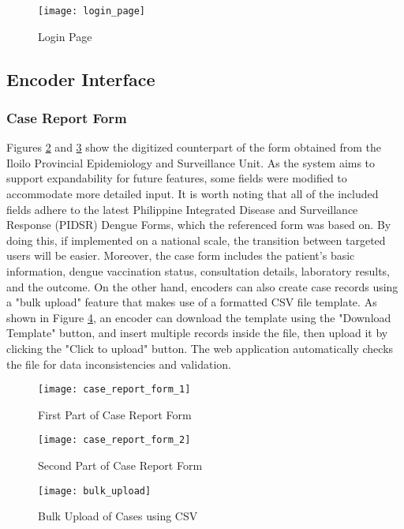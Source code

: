 \begin{figure}[H]
	\centering
	\texttt{[image: login\_page]}
	\caption{Login Page}
	\label{fig:login_page}
\end{figure}

\subsection{Encoder Interface}
\subsubsection{Case Report Form}
Figures \ref{fig:case_report_form_1} and \ref{fig:case_report_form_2} show the digitized counterpart of the form obtained from the Iloilo Provincial Epidemiology and Surveillance Unit. As the system aims to support expandability for future features, some fields were modified to accommodate more detailed input. It is worth noting that all of the included fields adhere to the latest Philippine Integrated Disease and Surveillance Response (PIDSR) Dengue Forms, which the referenced form was based on. By doing this, if implemented on a national scale, the transition between targeted users will be easier. Moreover, the case form includes the patient's basic information, dengue vaccination status, consultation details, laboratory results, and the outcome. On the other hand, encoders can also create case records using a "bulk upload" feature that makes use of a formatted CSV file template. As shown in Figure \ref{fig:bulk_upload}, an encoder can download the template using the "Download Template" button, and insert multiple records inside the file, then upload it by clicking the "Click to upload" button. The web application automatically checks the file for data inconsistencies and validation. 
\begin{figure}[H]
	\centering
	\texttt{[image: case\_report\_form\_1]}
	\caption{First Part of Case Report Form}
	\label{fig:case_report_form_1}
\end{figure}
\begin{figure}[H]
	\centering
	\texttt{[image: case\_report\_form\_2]}
	\caption{Second Part of Case Report Form}
	\label{fig:case_report_form_2}
\end{figure}
\begin{figure}[H]
	\centering
	\texttt{[image: bulk\_upload]}
	\caption{Bulk Upload of Cases using CSV}
	\label{fig:bulk_upload}
\end{figure}

